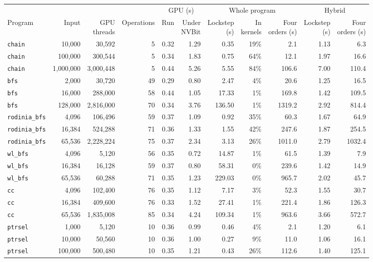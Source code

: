 \begin{tabular}{lrrrrrrrrrr}
\toprule
 & & & & \multicolumn{2}{c}{GPU (s)} & \multicolumn{3}{c}{Whole program} & \multicolumn{2}{c}{Hybrid} \\
\cmidrule(lr){5-6} \cmidrule(lr){7-9} \cmidrule(lr){10-11}
Program & Input & \shortstack{GPU\\threads} & Operations & Run & \shortstack{Under\\NVBit} & \shortstack{Lockstep\\(s)} & \shortstack{In\\kernels} & \shortstack{Four\\orders (s)} & \shortstack{Lockstep\\(s)} & \shortstack{Four\\orders (s)} \\
\midrule
\texttt{chain} & 10,000 & 30,592 & 5 & 0.32 & 1.29 & 0.35 & 19\% & 2.1 & 1.13 & 6.3 \\
\texttt{chain} & 100,000 & 300,544 & 5 & 0.34 & 1.83 & 0.75 & 64\% & 12.1 & 1.97 & 16.6 \\
\texttt{chain} & 1,000,000 & 3,000,448 & 5 & 0.44 & 5.26 & 5.55 & 84\% & 106.6 & 7.00 & 110.4 \\
\addlinespace
\texttt{bfs} & 2,000 & 30,720 & 49 & 0.29 & 0.80 & 2.47 & 4\% & 20.6 & 1.25 & 16.5 \\
\texttt{bfs} & 16,000 & 288,000 & 58 & 0.44 & 1.05 & 17.33 & 1\% & 169.8 & 1.42 & 109.5 \\
\texttt{bfs} & 128,000 & 2,816,000 & 70 & 0.34 & 3.76 & 136.50 & 1\% & 1319.2 & 2.92 & 814.4 \\
\addlinespace
\texttt{rodinia\_bfs} & 4,096 & 106,496 & 59 & 0.37 & 1.09 & 0.92 & 35\% & 60.3 & 1.67 & 64.9 \\
\texttt{rodinia\_bfs} & 16,384 & 524,288 & 71 & 0.36 & 1.33 & 1.55 & 42\% & 247.6 & 1.87 & 254.5 \\
\texttt{rodinia\_bfs} & 65,536 & 2,228,224 & 75 & 0.37 & 2.34 & 3.13 & 26\% & 1011.0 & 2.79 & 1032.4 \\
\addlinespace
\texttt{wl\_bfs} & 4,096 & 5,120 & 56 & 0.35 & 0.72 & 14.87 & 1\% & 61.5 & 1.39 & 7.9 \\
\texttt{wl\_bfs} & 16,384 & 16,128 & 59 & 0.37 & 0.80 & 58.31 & 0\% & 239.6 & 1.42 & 14.9 \\
\texttt{wl\_bfs} & 65,536 & 60,288 & 71 & 0.35 & 1.23 & 229.03 & 0\% & 965.7 & 2.02 & 45.7 \\
\addlinespace
\texttt{cc} & 4,096 & 102,400 & 76 & 0.35 & 1.12 & 7.17 & 3\% & 52.3 & 1.55 & 30.7 \\
\texttt{cc} & 16,384 & 409,600 & 76 & 0.33 & 1.52 & 27.41 & 1\% & 221.4 & 1.86 & 126.3 \\
\texttt{cc} & 65,536 & 1,835,008 & 85 & 0.34 & 4.24 & 109.34 & 1\% & 963.6 & 3.66 & 572.7 \\
\addlinespace
\texttt{ptrsel} & 1,000 & 5,120 & 10 & 0.36 & 0.99 & 0.46 & 4\% & 2.1 & 1.20 & 6.1 \\
\texttt{ptrsel} & 10,000 & 50,560 & 10 & 0.36 & 1.00 & 0.27 & 9\% & 11.0 & 1.06 & 16.1 \\
\texttt{ptrsel} & 100,000 & 500,480 & 10 & 0.35 & 1.21 & 0.43 & 26\% & 112.6 & 1.40 & 125.1 \\
\bottomrule
\end{tabular}
